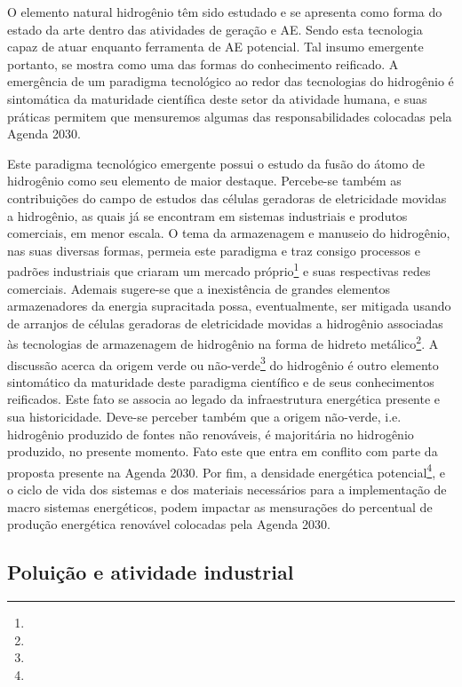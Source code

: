 \documentclass[
  12pt,       %
  openright,      %
  twoside,      %
  a4paper,      %
  english,      %
  french,       %
  spanish,      %
  brazil        %
  ]{abntex2}
\begin{document}
O elemento natural hidrogênio têm sido estudado e se apresenta como forma do estado da arte dentro das atividades de geração e AE. Sendo esta tecnologia capaz de atuar enquanto ferramenta de AE potencial. Tal insumo emergente portanto, se mostra como uma das formas do conhecimento reificado. A emergência de um paradigma tecnológico ao redor das tecnologias do hidrogênio é sintomática da maturidade científica deste setor da atividade humana, e suas práticas permitem que mensuremos algumas das responsabilidades colocadas pela Agenda 2030. 

Este paradigma tecnológico emergente possui o estudo da fusão do átomo de hidrogênio como seu elemento de maior destaque. Percebe-se também as contribuições do campo de estudos das células geradoras de eletricidade movidas a hidrogênio, as quais já se encontram em sistemas industriais e produtos comerciais, em menor escala. O tema da armazenagem e manuseio do hidrogênio, nas suas diversas formas, permeia este paradigma e traz consigo processos e padrões industriais que criaram um mercado próprio\footnote{} e suas respectivas redes comerciais. Ademais sugere-se que a inexistência de grandes elementos armazenadores da energia supracitada possa, eventualmente, ser mitigada usando de arranjos de células geradoras de eletricidade movidas a hidrogênio associadas às tecnologias de armazenagem de hidrogênio na forma de hidreto metálico\footnote{}. A discussão acerca da origem verde ou não-verde\footnote{} do hidrogênio é outro elemento sintomático da maturidade deste paradigma científico e de seus conhecimentos reificados. Este fato se associa ao legado da infraestrutura energética presente e sua historicidade. Deve-se perceber também que a origem não-verde, i.e. hidrogênio produzido de fontes não renováveis, é majoritária no hidrogênio produzido, no presente momento. Fato este que entra em conflito com parte da proposta presente na Agenda 2030. Por fim, a densidade energética potencial\footnote{}, e o ciclo de vida dos sistemas e dos materiais necessários para a implementação de macro sistemas energéticos, podem impactar as mensurações do percentual de produção energética renovável colocadas pela Agenda 2030.


\subsection{Poluição e atividade industrial}
\end{document}

